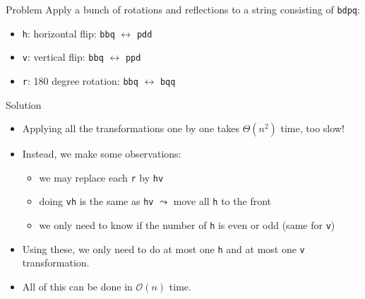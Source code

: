\begin{frame}
  \frametitle{\problemtitle}
  \begin{block}{Problem}
    Apply a bunch of rotations and reflections to a string consisting of \texttt{bdpq}:
    \begin{itemize}
      \item \texttt{h}: horizontal flip: \texttt{bbq} $\leftrightarrow$ \texttt{pdd}
      \item \texttt{v}: vertical flip: \texttt{bbq} $\leftrightarrow$ \texttt{ppd}
      \item \texttt{r}: 180 degree rotation: \texttt{bbq} $\leftrightarrow$ \texttt{bqq}
    \end{itemize}
  \end{block}
  \pause
  \begin{block}{Solution}
    \begin{itemize}
      \item<+-> Applying all the transformations one by one takes $\Theta(n^2)$ time, too slow!
      \item<+-> Instead, we make some observations:
        \begin{itemize}
          \item we may replace each \texttt{r} by \texttt{hv}
          \item doing \texttt{vh} is the same as \texttt{hv} $\leadsto$ move all \texttt{h} to the front
          \item we only need to know if the number of \texttt{h} is even or odd (same for \texttt{v})
        \end{itemize}
      \item<+-> Using these, we only need to do at most one \texttt{h} and at most one \texttt{v} transformation.
      \item<+-> All of this can be done in $\mathcal{O}(n)$ time.
    \end{itemize}
  \end{block}
\end{frame}
